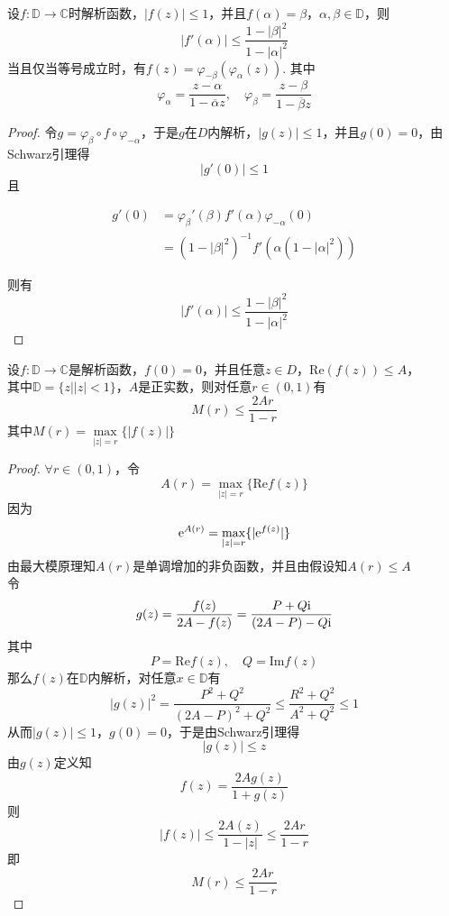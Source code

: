 \begin{proposition}

    设$f:\mathbb{D} \to \mathbb{C}$时解析函数，$|f(z)| \leq 1$，并且$f(\alpha) = \beta$，$\alpha, \beta \in \mathbb{D}$，则
    $$|f'(\alpha)| \leq \dfrac{1 - |\beta|^2}{1 - |\alpha|^2}$$
    当且仅当等号成立时，有$f(z) = \varphi_{-\beta}(\varphi_{\alpha}(z))$. 其中
    $$\varphi_{\alpha} = \dfrac{z - \alpha}{1 - \overline{\alpha}{z}}, \quad \varphi_{\beta} = \dfrac{z - \beta}{1 - \overline{\beta}{z}}$$

\end{proposition}

\begin{proof}
    
    令$g = \varphi_{\beta}\circ f \circ \varphi_{-\alpha}$，于是$g$在$D$内解析，$|g(z)| \leq 1$，并且$g(0) = 0$，由\textup{Schwarz}引理得
    $$|g'(0)| \leq 1$$
    且
    
    \begin{align*}
        g'(0) & = \varphi_{\beta}'(\beta) f'(\alpha) \varphi_{-\alpha}(0) \\
        & =  (1 - |\beta|^2)^{-1}f'(\alpha (1 - |\alpha|^2))
    \end{align*}

    则有
    $$|f'(\alpha)| \leq \dfrac{1 - |\beta|^2}{1 - |\alpha|^2}$$

\end{proof}

\begin{proposition}
    
    设$f:\mathbb{D} \to \mathbb{C}$是解析函数，$f(0) = 0$，并且任意$z \in D$，$\mathrm{Re}(f(z)) \leq A$，\\
    其中$\mathbb{D} = \{z \big| |z| < 1\}$，$A$是正实数，则对任意$r \in (0, 1)$有
    $$M(r) \leq \dfrac{2Ar}{1 - r}$$
    其中$M(r) = \max\limits_{|z| = r}\{|f(z)|\}$

\end{proposition}

\begin{proof}
    
    $\forall r \in (0, 1)$，令
    $$A(r) = \max_{|z| = r}\{\mathrm{Re}f(z)\}$$
    因为
    $$\mathrm{e}^{A(r)} = \max_{|z| = r}\{|\mathrm{e}^{f(z)}|\}$$
    由最大模原理知$A(r)$是单调增加的非负函数，并且由假设知$A(r) \leq A$ \\
    令
    $$ g(z) = \dfrac{f(z)}{2A - f(z)} = \dfrac{P + Q\mathrm{i}}{(2A - P) - Q\mathrm{i}} $$
    其中
    $$ P = \mathrm{Re}f(z), \quad Q = \mathrm{Im}f(z) $$
    那么$f(z)$在$\mathbb{D}$内解析，对任意$x \in \mathbb{D}$有
    $$|g(z)|^2 = \dfrac{P^2 + Q^2}{(2A - P)^2 + Q^2} \leq \dfrac{R^2 + Q^2}{A^2 + Q^2} \leq 1$$
    从而$|g(z)| \leq 1$，$g(0) = 0$，于是由\textup{Schwarz}引理得
    $$|g(z) | \leq z$$
    由$g(z)$定义知
    $$f(z) = \dfrac{2Ag(z)}{1 + g(z)}$$
    则
    $$ |f(z)| \leq \dfrac{2A(z)}{1 - |z|} \leq \dfrac{2Ar}{1 - r}$$
    即
    $$M(r) \leq \dfrac{2Ar}{1 - r}$$

\end{proof}

